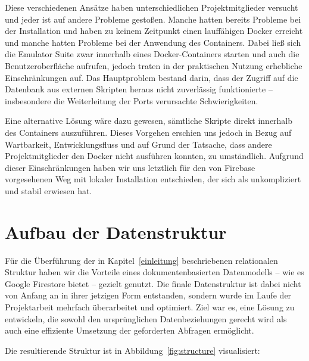 \documentclass[12pt,a4paper%
              ,oneside     %
              ,titlepage
              ,DIV=13
              ,headinclude
              ,footinclude=false%
              ,cleardoublepage=empty%
              ,parskip=half,
              BCOR=0mm,
              ]{scrreprt}
\begin{document}
Diese verschiedenen Ansätze haben unterschiedlichen Projektmitglieder versucht und jeder ist auf andere Probleme gestoßen. Manche hatten bereits Probleme bei der Installation und haben zu keinem Zeitpunkt einen lauffähigen Docker erreicht und manche hatten Probleme bei der Anwendung des Containers. Dabei ließ sich die Emulator Suite zwar innerhalb eines Docker-Containers starten und auch die Benutzeroberfläche aufrufen, jedoch traten in der praktischen Nutzung erhebliche Einschränkungen auf. Das Hauptproblem bestand darin, dass der Zugriff auf die Datenbank aus externen Skripten heraus nicht zuverlässig funktionierte – insbesondere die Weiterleitung der Ports verursachte Schwierigkeiten.

Eine alternative Lösung wäre dazu gewesen, sämtliche Skripte direkt innerhalb des Containers auszuführen. Dieses Vorgehen erschien uns jedoch in Bezug auf Wartbarkeit, Entwicklungsfluss und auf Grund der Tatsache, dass andere Projektmitglieder den Docker nicht ausführen konnten, zu umständlich. Aufgrund dieser Einschränkungen haben wir uns letztlich für den von Firebase vorgesehenen Weg mit lokaler Installation entschieden, der sich als unkompliziert und stabil erwiesen hat.

\chapter{Aufbau der Datenstruktur}
\label{struktur-chapter}

Für die Überführung der in Kapitel~\ref{einleitung} beschriebenen relationalen Struktur haben wir die Vorteile eines dokumentenbasierten Datenmodells – wie es Google Firestore bietet – gezielt genutzt. Die finale Datenstruktur ist dabei nicht von Anfang an in ihrer jetzigen Form entstanden, sondern wurde im Laufe der Projektarbeit mehrfach überarbeitet und optimiert. Ziel war es, eine Lösung zu entwickeln, die sowohl den ursprünglichen Datenbeziehungen gerecht wird als auch eine effiziente Umsetzung der geforderten Abfragen ermöglicht.

Die resultierende Struktur ist in Abbildung~\ref{fig:structure} visualisiert:
\end{document}
